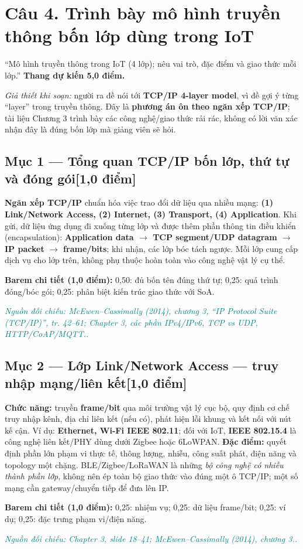 \documentclass[11pt,a4paper]{article}
\newcommand{\pointpart}[2]{\subsection*{Mục #1 --- #2\hfill\normalsize\color{teal}[1,0 điểm]}}
\newcommand{\src}[1]{\par\noindent\textcolor{teal}{\footnotesize\textit{Nguồn đối chiếu: #1.}}\par}
\newcommand{\scoring}[1]{\par\noindent\textbf{Barem chi tiết (1,0 điểm):} #1\par}
\newcommand{\kw}[1]{\textbf{#1}}
\begin{document}
\section{Câu 4. Trình bày mô hình truyền thông bốn lớp dùng trong IoT}
\begin{questionbox}
``Mô hình truyền thông trong IoT (4 lớp); nêu vai trò, đặc điểm và giao thức mỗi lớp.'' \textbf{Thang dự kiến 5,0 điểm.}\par
\small\emph{Giả thiết khi soạn:} người ra đề nói tới \textbf{TCP/IP 4-layer model}, vì đề gợi ý từng ``layer'' trong truyền thông. Đây là \textbf{phương án ôn theo ngăn xếp TCP/IP}; tài liệu Chương 3 trình bày các công nghệ/giao thức rải rác, không có lời văn xác nhận đây là đúng bốn lớp mà giảng viên sẽ hỏi.
\end{questionbox}
\pointpart{1}{Tổng quan TCP/IP bốn lớp, thứ tự và đóng gói}
\kw{Ngăn xếp TCP/IP} chuẩn hóa việc trao đổi dữ liệu qua nhiều mạng: \kw{(1) Link/Network Access, (2) Internet, (3) Transport, (4) Application}. Khi gửi, dữ liệu ứng dụng đi xuống từng lớp và được thêm phần thông tin điều khiển (encapsulation): \kw{Application data $\to$ TCP segment/UDP datagram $\to$ IP packet $\to$ frame/bits}; khi nhận, các lớp bóc tách ngược. Mỗi lớp cung cấp dịch vụ cho lớp trên, không phụ thuộc hoàn toàn vào công nghệ vật lý cụ thể.
\begin{center}\end{center}
\scoring{0,50: đủ bốn tên đúng thứ tự; 0,25: quá trình đóng/bóc gói; 0,25: phân biệt kiến trúc giao thức với SoA.}
\src{McEwen--Cassimally (2014), chương 3, ``IP Protocol Suite (TCP/IP)'', tr. 42--61; Chapter 3, các phần IPv4/IPv6, TCP vs UDP, HTTP/CoAP/MQTT.}

\pointpart{2}{Lớp Link/Network Access --- truy nhập mạng/liên kết}
\kw{Chức năng:} truyền \kw{frame/bit} qua môi trường vật lý cục bộ, quy định cơ chế truy nhập kênh, địa chỉ liên kết (nếu có), phát hiện lỗi khung và kết nối với nút kế cận. Ví dụ: \kw{Ethernet, Wi-Fi IEEE 802.11}; đối với IoT, \kw{IEEE 802.15.4} là công nghệ liên kết/PHY dùng dưới Zigbee hoặc 6LoWPAN. \kw{Đặc điểm:} quyết định phần lớn phạm vi thực tế, thông lượng, nhiễu, công suất phát, điện năng và topology một chặng. BLE/Zigbee/LoRaWAN là những \emph{bộ công nghệ có nhiều thành phần lớp}, không nên ép toàn bộ giao thức vào đúng một ô TCP/IP; một số mạng cần gateway/chuyển tiếp để đưa lên IP.
\scoring{0,25: nhiệm vụ; 0,25: dữ liệu frame/bit; 0,25: ví dụ; 0,25: đặc trưng phạm vi/điện năng.}
\src{Chapter 3, slide 18--41; McEwen--Cassimally (2014), chương 3.}
\end{document}
